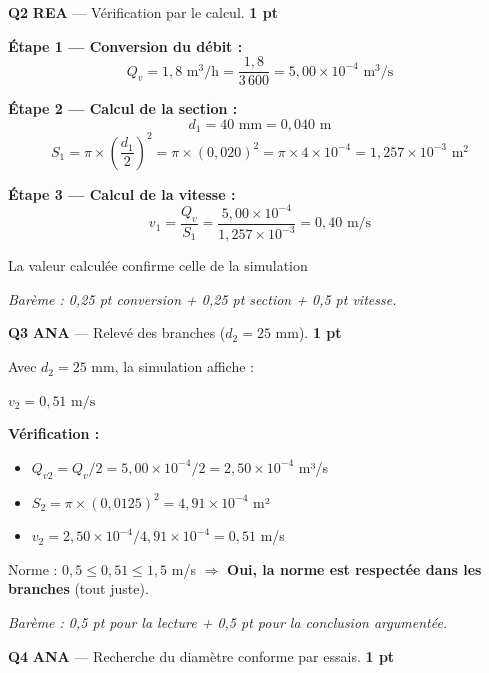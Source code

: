 \documentclass[a4paper,11pt]{article}
\newcommand{\pts}[1]{\hfill\textcolor{gris}{\small\textbf{#1}}}
\newcommand{\comp}[1]{\colorbox{blue!10}{\scriptsize\textbf{#1}}}
\begin{document}
\textbf{Q2} \comp{REA} — Vérification par le calcul. \pts{1 pt}

\begin{corrbox}
\textbf{Étape 1 — Conversion du débit :}
\[
Q_v = 1{,}8 \text{ m}^3\text{/h} = \frac{1{,}8}{3\,600} = 5{,}00 \times 10^{-4} \text{ m}^3\text{/s}
\]

\textbf{Étape 2 — Calcul de la section :}
\[
d_1 = 40 \text{ mm} = 0{,}040 \text{ m}
\]
\[
S_1 = \pi \times \left(\frac{d_1}{2}\right)^2 = \pi \times (0{,}020)^2 = \pi \times 4 \times 10^{-4} = 1{,}257 \times 10^{-3} \text{ m}^2
\]

\textbf{Étape 3 — Calcul de la vitesse :}
\[
v_1 = \frac{Q_v}{S_1} = \frac{5{,}00 \times 10^{-4}}{1{,}257 \times 10^{-3}} = \boxed{0{,}40 \text{ m/s}}
\]

La valeur calculée confirme celle de la simulation \checkmark

\smallskip
\textit{Barème : 0,25 pt conversion + 0,25 pt section + 0,5 pt vitesse.}
\end{corrbox}

\textbf{Q3} \comp{ANA} — Relevé des branches ($d_2 = 25$ mm). \pts{1 pt}

\begin{corrbox}
Avec $d_2 = 25$ mm, la simulation affiche :

$v_2 = \boxed{0{,}51 \text{ m/s}}$

\textbf{Vérification :}
\begin{itemize}[nosep]
  \item $Q_{v2} = Q_v / 2 = 5{,}00 \times 10^{-4} / 2 = 2{,}50 \times 10^{-4}$ m³/s
  \item $S_2 = \pi \times (0{,}0125)^2 = 4{,}91 \times 10^{-4}$ m²
  \item $v_2 = 2{,}50 \times 10^{-4} / 4{,}91 \times 10^{-4} = 0{,}51$ m/s
\end{itemize}

Norme : $0{,}5 \leq 0{,}51 \leq 1{,}5$ m/s $\Rightarrow$ \textbf{Oui, la norme est respectée dans les branches} (tout juste).

\smallskip
\textit{Barème : 0,5 pt pour la lecture + 0,5 pt pour la conclusion argumentée.}
\end{corrbox}

\textbf{Q4} \comp{ANA} — Recherche du diamètre conforme par essais. \pts{1 pt}
\end{document}
